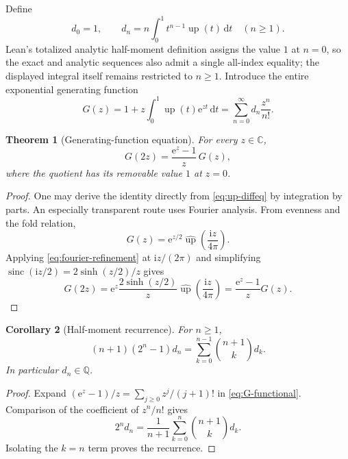 \documentclass[11pt,oneside]{article}
\newtheorem{theorem}{Theorem}[section]
\newtheorem{corollary}[theorem]{Corollary}
\theoremstyle{definition}
\theoremstyle{remark}
\newcommand{\C}{\mathbb C}
\newcommand{\Q}{\mathbb Q}
\newcommand{\Up}{\operatorname{up}}
\newcommand{\sinc}{\operatorname{sinc}}
\newcommand{\e}{\mathrm e}
\newcommand{\ii}{\mathrm i}
\newcommand{\dd}{\,\mathrm d}
\begin{document}
Define
\begin{equation}
 d_0=1,
 \qquad
 d_n=n\int_0^1 t^{n-1}\Up(t)\dd t\quad(n\ge1).             \label{eq:d-integral}
\end{equation}
Lean's totalized analytic half-moment definition assigns the value $1$ at $n=0$,
so the exact and analytic sequences also admit a single all-index equality;
the displayed integral itself remains restricted to $n\ge1$.
Introduce the entire exponential generating function
\begin{equation}
 G(z)=1+z\int_0^1\Up(t)\e^{zt}\dd t
 =\sum_{n=0}^{\infty}d_n\frac{z^n}{n!}.                   \label{eq:G-def}
\end{equation}

\begin{theorem}[Generating-function equation]
For every $z\in\C$,
\begin{equation}
 G(2z)=\frac{\e^z-1}{z}\,G(z),                            \label{eq:G-functional}
\end{equation}
where the quotient has its removable value $1$ at $z=0$.
\end{theorem}

\begin{proof}
One may derive the identity directly from \eqref{eq:up-diffeq} by integration by parts.
An especially transparent route uses Fourier analysis.  From evenness and the fold relation,
\begin{equation}
 G(z)=\e^{z/2}\widehat{\Up}\!\left(\frac{\ii z}{4\pi}\right). \label{eq:G-Fourier}
\end{equation}
Applying \eqref{eq:fourier-refinement} at $\ii z/(2\pi)$ and simplifying
$\sinc(\ii z/2)=2\sinh(z/2)/z$ gives
\begin{equation*}
 G(2z)=\e^z\frac{2\sinh(z/2)}{z}
 \widehat{\Up}\!\left(\frac{\ii z}{4\pi}\right)
 =\frac{\e^z-1}{z}G(z).
\end{equation*}
\end{proof}

\begin{corollary}[Half-moment recurrence]
For $n\ge1$,
\begin{equation}
 (n+1)(2^n-1)d_n
 =\sum_{k=0}^{n-1}\binom{n+1}{k}d_k.                      \label{eq:d-recurrence}
\end{equation}
In particular $d_n\in\Q$.
\end{corollary}

\begin{proof}
Expand $(\e^z-1)/z=\sum_{j\ge0}z^j/(j+1)!$ in
\eqref{eq:G-functional}.  Comparison of the coefficient of $z^n/n!$ gives
\begin{equation*}
 2^nd_n=\frac1{n+1}\sum_{k=0}^{n}\binom{n+1}{k}d_k.
\end{equation*}
Isolating the $k=n$ term proves the recurrence.
\end{proof}
\end{document}
